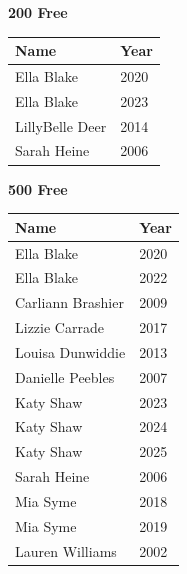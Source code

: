 \vspace{0.3em}
\vspace{1.2em}
\noindent\begin{minipage}[t]{0.48\textwidth}
\centering
\textbf{\textcolor{teamprimary}{200 Free}}\par
\vspace{0.5em}
\centering
\small
\renewcommand{\arraystretch}{1.0}
\setlength{\tabcolsep}{4pt}
\begin{tabular}{@{}p{3.0cm}p{1.0cm}@{}}
\toprule
\textbf{Name} & \textbf{Year} \\
\midrule
Ella Blake & 2020 \\
Ella Blake & 2023 \\
LillyBelle Deer & 2014 \\
Sarah Heine & 2006 \\
\bottomrule
\end{tabular}
\end{minipage}
\hfill
\begin{minipage}[t]{0.48\textwidth}
\centering
\textbf{\textcolor{teamprimary}{500 Free}}\par
\vspace{0.5em}
\centering
\small
\renewcommand{\arraystretch}{1.0}
\setlength{\tabcolsep}{4pt}
\begin{tabular}{@{}p{3.0cm}p{1.0cm}@{}}
\toprule
\textbf{Name} & \textbf{Year} \\
\midrule
Ella Blake & 2020 \\
Ella Blake & 2022 \\
Carliann Brashier & 2009 \\
Lizzie Carrade & 2017 \\
Louisa Dunwiddie & 2013 \\
Danielle Peebles & 2007 \\
Katy Shaw & 2023 \\
Katy Shaw & 2024 \\
Katy Shaw & 2025 \\
Sarah Heine & 2006 \\
Mia Syme & 2018 \\
Mia Syme & 2019 \\
Lauren Williams & 2002 \\
\bottomrule
\end{tabular}
\end{minipage}
\vspace{1.2em}
